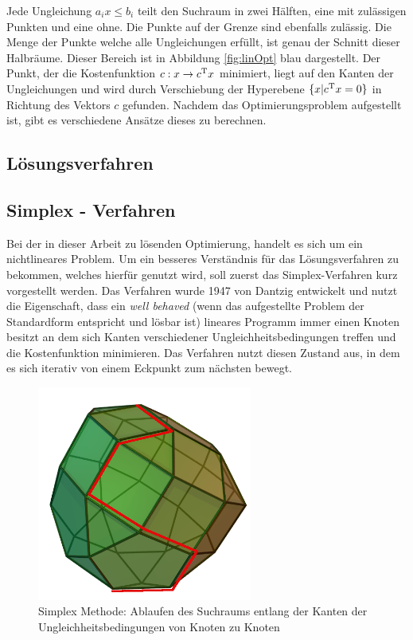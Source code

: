 \documentclass{like}
\begin{document}
Jede Ungleichung $a_i x \leq b_i$ teilt den Suchraum in zwei Hälften, eine mit zulässigen Punkten und eine ohne. Die Punkte auf der Grenze sind ebenfalls zulässig. Die Menge der Punkte welche alle Ungleichungen erfüllt, ist genau der Schnitt dieser Halbräume. Dieser Bereich ist in Abbildung \ref{fig:linOpt} blau dargestellt. Der Punkt, der die Kostenfunktion $c: x \rightarrow c\textsuperscript{T} x$ minimiert, liegt auf den Kanten der Ungleichungen und wird durch Verschiebung der Hyperebene $ \{x| c\textsuperscript{T} x = 0 \}$ in Richtung des Vektors \(c\) gefunden. Nachdem das Optimierungsproblem aufgestellt ist, gibt es verschiedene Ansätze dieses zu berechnen.


\subsection*{Lösungsverfahren}

\subsection{Simplex - Verfahren}
Bei der in dieser Arbeit zu lösenden Optimierung, handelt es sich um ein nichtlineares Problem. Um ein besseres Verständnis für das Lösungsverfahren zu bekommen, welches hierfür genutzt wird, soll zuerst das Simplex-Verfahren kurz vorgestellt werden. Das Verfahren wurde 1947 von Dantzig \cite{dantzig51} entwickelt und nutzt die Eigenschaft, dass ein \textit{well behaved} (wenn das aufgestellte Problem der Standardform entspricht und lösbar ist) lineares Programm immer einen Knoten besitzt an dem sich Kanten verschiedener Ungleichheitsbedingungen treffen und die Kostenfunktion minimieren. Das Verfahren nutzt diesen Zustand aus, in dem es sich iterativ von einem Eckpunkt zum nächsten bewegt. 
\begin{figure}[ht!]
	\centering
	\includegraphics[width=200pt]{Abbildungen/simplexMethod.png}
	\caption{Simplex Methode: Ablaufen des Suchraums entlang der Kanten der Ungleichheitsbedingungen von Knoten zu Knoten}
	\label{fig:splxMethod}
\end{figure}
\end{document}
